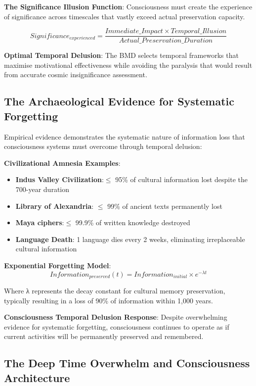 \documentclass[12pt]{article}
\begin{document}
\textbf{The Significance Illusion Function}: Consciousness must create the experience of significance across timescales that vastly exceed actual preservation capacity.

$$Significance_{experienced} = \frac{Immediate\_Impact \times Temporal\_Illusion}{Actual\_Preservation\_Duration}$$

\textbf{Optimal Temporal Delusion}: The BMD selects temporal frameworks that maximise motivational effectiveness while avoiding the paralysis that would result from accurate cosmic insignificance assessment.

\subsection{The Archaeological Evidence for Systematic Forgetting}

Empirical evidence demonstrates the systematic nature of information loss that consciousness systems must overcome through temporal delusion:

\textbf{Civilizational Amnesia Examples}:
\begin{itemize}
\item \textbf{Indus Valley Civilization}:$\le$ 95\% of cultural information lost despite the 700-year duration
\item \textbf{Library of Alexandria}: $\le$ 99\% of ancient texts permanently lost
\item \textbf{Maya ciphers}:$\le$ 99.9\% of written knowledge destroyed
\item \textbf{Language Death}: 1 language dies every 2 weeks, eliminating irreplaceable cultural information
\end{itemize}

\textbf{Exponential Forgetting Model}:
$$Information_{preserved}(t) = Information_{initial} \times e^{-\lambda t}$$

Where λ represents the decay constant for cultural memory preservation, typically resulting in a loss of 90\% of information within 1,000 years.

\textbf{Consciousness Temporal Delusion Response}: Despite overwhelming evidence for systematic forgetting, consciousness continues to operate as if current activities will be permanently preserved and remembered.

\subsection{The Deep Time Overwhelm and Consciousness Architecture}
\end{document}
